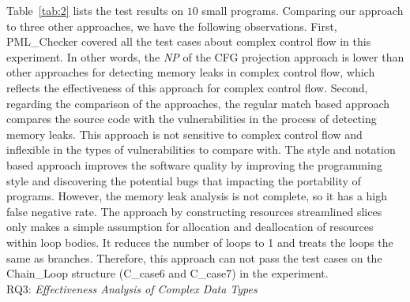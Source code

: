 Table~\ref{tab:2} lists the test results on $10$ small programs. Comparing our approach to three other approaches, we have the following observations.
First, PML\_Checker covered all the test cases about complex control flow in this experiment. In other words, the \textit{NP} of the CFG projection approach is lower than other approaches for detecting memory leaks in complex control flow, which reflects the effectiveness of this approach for complex control flow.
Second, regarding the comparison of the approaches, the regular match based approach compares the source code with the vulnerabilities in the process of detecting memory leaks. This approach is not sensitive to complex control flow and inflexible in the types of vulnerabilities to compare with. The style and notation based approach improves the software quality by improving the programming style and discovering the potential bugs that impacting the portability of programs. However, the memory leak analysis is not complete, so it has a high false negative rate. The approach by constructing resources streamlined slices only makes a simple assumption for allocation and deallocation of resources within loop bodies. It reduces the number of loops to 1 and treats the loops the same as branches. Therefore, this approach can not pass the test cases on the Chain\_Loop structure (C\_case6 and C\_case7) in the experiment.\\


\noindent RQ3: \textit{Effectiveness Analysis of Complex Data Types}


